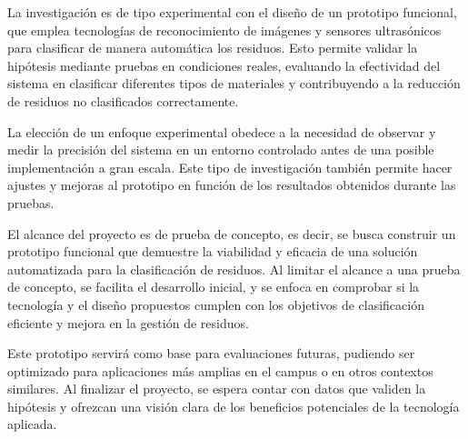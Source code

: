 La investigación es de tipo experimental con el diseño de un prototipo funcional, que emplea tecnologías de reconocimiento de imágenes y sensores ultrasónicos para clasificar de manera automática los residuos. Esto permite validar la hipótesis mediante pruebas en condiciones reales, evaluando la efectividad del sistema en clasificar diferentes tipos de materiales y contribuyendo a la reducción de residuos no clasificados correctamente.

La elección de un enfoque experimental obedece a la necesidad de observar y medir la precisión del sistema en un entorno controlado antes de una posible implementación a gran escala. Este tipo de investigación también permite hacer ajustes y mejoras al prototipo en función de los resultados obtenidos durante las pruebas.


El alcance del proyecto es de prueba de concepto, es decir, se busca construir un prototipo funcional que demuestre la viabilidad y eficacia de una solución automatizada para la clasificación de residuos. Al limitar el alcance a una prueba de concepto, se facilita el desarrollo inicial, y se enfoca en comprobar si la tecnología y el diseño propuestos cumplen con los objetivos de clasificación eficiente y mejora en la gestión de residuos.

Este prototipo servirá como base para evaluaciones futuras, pudiendo ser optimizado para aplicaciones más amplias en el campus o en otros contextos similares. Al finalizar el proyecto, se espera contar con datos que validen la hipótesis y ofrezcan una visión clara de los beneficios potenciales de la tecnología aplicada.